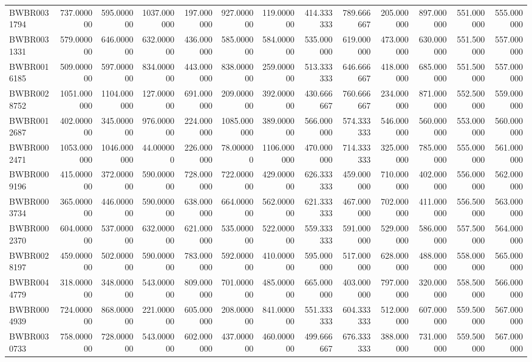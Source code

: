 \begin{longtable}{lrrrrrrrrrrrr}
BWBR0031794 & 737.000000 & 595.000000 & 1037.000000 & 197.000000 & 927.000000 & 119.000000 & 414.333333 & 789.666667 & 205.000000 & 897.000000 & 551.000000 & 555.000000 \\
BWBR0031331 & 579.000000 & 646.000000 & 632.000000 & 436.000000 & 585.000000 & 584.000000 & 535.000000 & 619.000000 & 473.000000 & 630.000000 & 551.500000 & 557.000000 \\
BWBR0016185 & 509.000000 & 597.000000 & 834.000000 & 443.000000 & 838.000000 & 259.000000 & 513.333333 & 646.666667 & 418.000000 & 685.000000 & 551.500000 & 557.000000 \\
BWBR0028752 & 1051.000000 & 1104.000000 & 127.000000 & 691.000000 & 209.000000 & 392.000000 & 430.666667 & 760.666667 & 234.000000 & 871.000000 & 552.500000 & 559.000000 \\
BWBR0012687 & 402.000000 & 345.000000 & 976.000000 & 224.000000 & 1085.000000 & 389.000000 & 566.000000 & 574.333333 & 546.000000 & 560.000000 & 553.000000 & 560.000000 \\
BWBR0002471 & 1053.000000 & 1046.000000 & 44.000000 & 226.000000 & 78.000000 & 1106.000000 & 470.000000 & 714.333333 & 325.000000 & 785.000000 & 555.000000 & 561.000000 \\
BWBR0009196 & 415.000000 & 372.000000 & 590.000000 & 728.000000 & 722.000000 & 429.000000 & 626.333333 & 459.000000 & 710.000000 & 402.000000 & 556.000000 & 562.000000 \\
BWBR0003734 & 365.000000 & 446.000000 & 590.000000 & 638.000000 & 664.000000 & 562.000000 & 621.333333 & 467.000000 & 702.000000 & 411.000000 & 556.500000 & 563.000000 \\
BWBR0002370 & 604.000000 & 537.000000 & 632.000000 & 621.000000 & 535.000000 & 522.000000 & 559.333333 & 591.000000 & 529.000000 & 586.000000 & 557.500000 & 564.000000 \\
BWBR0028197 & 459.000000 & 502.000000 & 590.000000 & 783.000000 & 592.000000 & 410.000000 & 595.000000 & 517.000000 & 628.000000 & 488.000000 & 558.000000 & 565.000000 \\
BWBR0044779 & 318.000000 & 348.000000 & 543.000000 & 809.000000 & 701.000000 & 485.000000 & 665.000000 & 403.000000 & 797.000000 & 320.000000 & 558.500000 & 566.000000 \\
BWBR0004939 & 724.000000 & 868.000000 & 221.000000 & 605.000000 & 208.000000 & 841.000000 & 551.333333 & 604.333333 & 512.000000 & 607.000000 & 559.500000 & 567.000000 \\
BWBR0030733 & 758.000000 & 728.000000 & 543.000000 & 602.000000 & 437.000000 & 460.000000 & 499.666667 & 676.333333 & 388.000000 & 731.000000 & 559.500000 & 567.000000 \\

\end{longtable}
